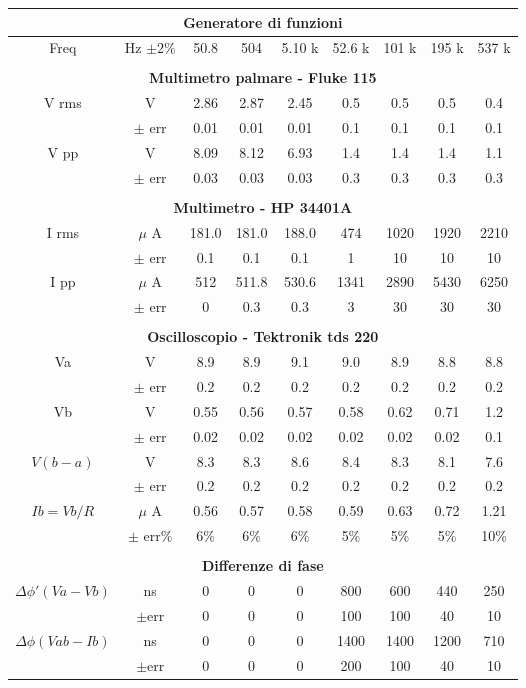 \begin{table}[H]
\begin{center}
\begin{tabular}{|c|c|c|c|c|c|c|c|c|}
\hline
\multicolumn{9}{|c|}{ \textbf{Generatore di funzioni} } \\ \hline
%
Freq & Hz $\pm 2$\% & 50.8 & 504 & 5.10 k & 52.6 k & 101 k & 195 k & 537 k \\ \hline
%
\multicolumn{9}{c}{}\\
\hline
\multicolumn{9}{|c|}{ \textbf{Multimetro palmare - Fluke 115} }\\ \hline
V rms & V & 2.86 & 2.87 & 2.45 & 0.5 & 0.5 & 0.5 & 0.4 \\ 
 & $\pm$ err & 0.01 & 0.01 & 0.01 & 0.1 & 0.1 & 0.1 & 0.1 \\ \hline
V pp & V & 8.09 & 8.12 & 6.93 & 1.4 & 1.4 & 1.4 & 1.1 \\ 
 & $\pm$ err & 0.03 & 0.03 & 0.03 & 0.3 & 0.3 & 0.3 & 0.3 \\
%
\hline
\multicolumn{9}{c}{}\\
\hline
\multicolumn{9}{|c|}{ \textbf{Multimetro - HP 34401A} }\\ \hline
I rms & $\mu$ A & 181.0 & 181.0 & 188.0 & 474 & 1020 & 1920 & 2210 \\ 
 & $\pm$ err & 0.1 & 0.1 & 0.1 & 1 & 10 & 10 & 10 \\ \hline
I pp & $\mu$ A & 512 & 511.8 & 530.6 & 1341 & 2890 & 5430 & 6250 \\
 & $\pm$ err & 0 & 0.3 & 0.3 & 3 & 30 & 30 & 30 \\\hline
\multicolumn{9}{c}{}\\
\hline
\multicolumn{9}{|c|}{ \textbf{Oscilloscopio - Tektronik tds 220} }\\ \hline
Va & V & 8.9 & 8.9 & 9.1 & 9.0 & 8.9 & 8.8 & 8.8 \\ 
 & $\pm$ err & 0.2 & 0.2 & 0.2 & 0.2 & 0.2 & 0.2 & 0.2 \\ \hline
Vb & V & 0.55 & 0.56 & 0.57 & 0.58 & 0.62 & 0.71 & 1.2 \\ 
 & $\pm$ err & 0.02 & 0.02 & 0.02 & 0.02 & 0.02 & 0.02 & 0.1 \\ \hline
$V(b-a)$ & V & 8.3 & 8.3 & 8.6 & 8.4 & 8.3 & 8.1 & 7.6 \\ 
 & $\pm$ err & 0.2 & 0.2 & 0.2 & 0.2 & 0.2 & 0.2 & 0.2 \\ \hline
$ Ib = Vb/R $ & $\mu$ A & 0.56 & 0.57 & 0.58 & 0.59 & 0.63 & 0.72 & 1.21 \\
 & $\pm$ err\% & 6\% & 6\% & 6\% & 5\% & 5\% & 5\% & 10\% \\ 
%
\hline
\multicolumn{9}{c}{}\\
\hline
%
\multicolumn{9}{|c|}{\textbf{Differenze di fase}}\\\hline
$\Delta\phi' (Va-Vb) $  & ns        & 0 & 0 & 0 & 800 & 600 & 440 & 250 \\
                        & $\pm$err  & 0 & 0 & 0 & 100 & 100 & 40  & 10  \\
\hline
$\Delta\phi (Vab - Ib)$ & ns        & 0 & 0 & 0 & 1400 & 1400 & 1200 & 710 \\ 
                        & $\pm$err  & 0 & 0 & 0 & 200  & 100  & 40   & 10  \\
\hline


\end{tabular}
\end{center}
\end{table}
